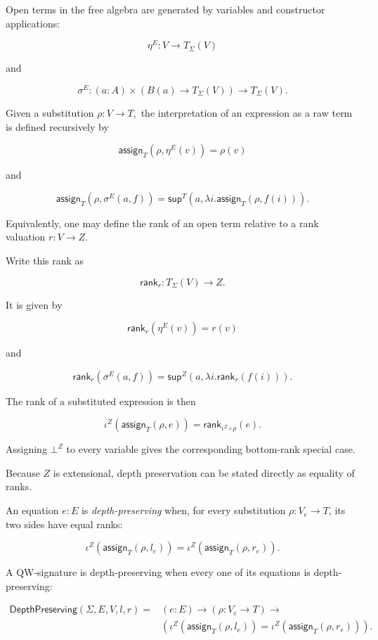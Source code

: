 \documentclass[runningheads]{llncs}
\begin{document}
Open terms in the free algebra are generated by variables and constructor
applications:

\[
\eta^E:V\to T_\Sigma (V)
\]

and

\[
\sigma^E:
(a:A)\times (B (a)\to T_\Sigma (V))
\to
T_\Sigma (V).
\]


Given a substitution \(\rho:V\to T,\) the interpretation of an
expression as a raw term is defined recursively by

\[
\mathsf{assign}_T (\rho,\eta^E (v)) = \rho (v)
\]

and

\[
\mathsf{assign}_T \left(\rho,\sigma^E (a,f)\right)
=
\mathsf{sup}^T \left(a,\lambda i.\mathsf{assign}_T (\rho,f (i))\right).
\]

Equivalently, one may define the rank of an open term relative to
a rank valuation \(r:V\to Z.\)

Write this rank as

\[
\mathsf{rank}_r:T_\Sigma (V)\to Z.
\]

It is given by

\[
\mathsf{rank}_r (\eta^E (v)) = r (v)
\]

and

\[
\mathsf{rank}_r \left(\sigma^E (a,f)\right)
=
\mathsf{sup}^Z \left(a,\lambda i.\mathsf{rank}_r (f (i))\right).
\]

The rank of a substituted expression is then

\[
\iota^Z (\mathsf{assign}_T (\rho,e))
=
\mathsf{rank}_{\iota^Z\circ\rho} (e).
\]

Assigning \(\bot^Z\) to every variable gives the corresponding bottom-rank
special case.

Because \(Z\) is extensional, depth preservation can be stated directly
as equality of ranks.

An equation \(e:E\) is \emph{depth-preserving} when, for every
substitution \(\rho:V_e\to T\), its two sides have equal ranks:

\[
\iota^Z (\mathsf{assign}_T (\rho,l_e))
=
\iota^Z (\mathsf{assign}_T (\rho,r_e)).
\]

A QW-signature is depth-preserving when every one of its equations is
depth-preserving:

\[
\begin{aligned}
\mathsf{DepthPreserving} (\Sigma,E,V,l,r)
={}&(e:E)\to(\rho:V_e\to T)\to\\
&\left(
\iota^Z (\mathsf{assign}_T (\rho,l_e))
 =
\iota^Z (\mathsf{assign}_T (\rho,r_e))
\right).
\end{aligned}
\]
\end{document}
